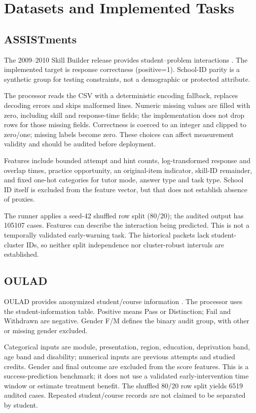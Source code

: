 \section{Datasets and Implemented Tasks}
\label{app:datasets}
\subsection{ASSISTments}
The 2009--2010 Skill Builder release provides student--problem interactions \cite{Feng2009ASSISTments}. The implemented target is response correctness (positive=1). School-ID parity is a synthetic group for testing constraints, not a demographic or protected attribute.

The processor reads the CSV with a deterministic encoding fallback, replaces decoding errors and skips malformed lines. Numeric missing values are filled with zero, including skill and response-time fields; the implementation does not drop rows for those missing fields. Correctness is coerced to an integer and clipped to zero/one; missing labels become zero. These choices can affect measurement validity and should be audited before deployment.

Features include bounded attempt and hint counts, log-transformed response and overlap times, practice opportunity, an original-item indicator, skill-ID remainder, and fixed one-hot categories for tutor mode, answer type and task type. School ID itself is excluded from the feature vector, but that does not establish absence of proxies.

The runner applies a seed-42 shuffled row split (80/20); the audited output has 105107 cases. Features can describe the interaction being predicted. This is not a temporally validated early-warning task. The historical packets lack student-cluster IDs, so neither split independence nor cluster-robust intervals are established.

\subsection{OULAD}
OULAD provides anonymized student/course information \cite{Kuzilek2017OULAD}. The processor uses the student-information table. Positive means Pass or Distinction; Fail and Withdrawn are negative. Gender F/M defines the binary audit group, with other or missing gender excluded.

Categorical inputs are module, presentation, region, education, deprivation band, age band and disability; numerical inputs are previous attempts and studied credits. Gender and final outcome are excluded from the score features. This is a success-prediction benchmark; it does not use a validated early-intervention time window or estimate treatment benefit. The shuffled 80/20 row split yields 6519 audited cases. Repeated student/course records are not claimed to be separated by student.

